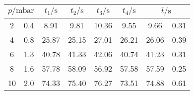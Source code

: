 \label{tab:tabDL1}
	\begin{tabular}{S[table-format=2.0]@{${}\pm{}$} S[table-format=1.1]S[table-format=2.2]S[table-format=2.2]S[table-format=2.2]S[table-format=2.2]S[table-format=2.2]@{${}\pm{}$} S[table-format=1.2]}
		\toprule
		 & {$t_1/\si{\second}$} & {$t_2/\si{\second}$} & {$t_3/\si{\second}$} & {$t_4/\si{\second}$} &  \\
		 & 0.4 & 8.91 & 9.81 & 10.36 & 9.55 & 9.66 & 0.31 \\
		 4 & 0.8 & 25.87 & 25.15 & 27.01 & 26.21 & 26.06 & 0.39 \\
		 6 & 1.3 & 40.78 & 41.33 & 42.06 & 40.74 & 41.23 & 0.31 \\
		 8 & 1.6 & 57.78 & 58.09 & 56.92 & 57.58 & 57.59 & 0.25 \\
		10 & 2.0 & 74.33 & 75.40 & 76.27 & 73.51 & 74.88 & 0.61 \\
		\bottomrule
	\end{tabular}
